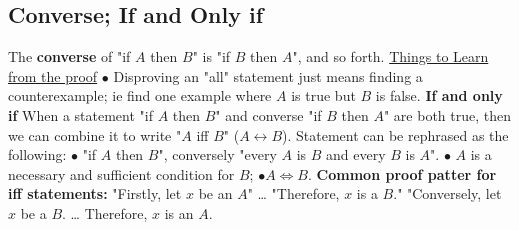 \documentclass{article}
\begin{document}
\subsection{Converse; If and Only if}
The \textbf{ converse } of "if $A$ then $B$" is "if $B$ then $A$", and so forth.
\newline
\newline
{}
\newline
\newline
{}
\newline
{}
\newline
\newline
\underline{Things to Learn from the proof}
\newline
\newline
$\bullet$ Disproving an "all" statement just means finding a counterexample;
ie find one example where $A$ is true but $B$ is false.
\newline
\newline
\textbf{If and only if} When a statement "if $A$ then $B$" and converse "if $B$ then $A$" are both true, then we can 
combine it to write "$A$ iff $B$" ($A \leftrightarrow B$).
\newline
\newline
Statement can be rephrased as the following:
\newline
$\bullet$ "if $A$ then $B$", conversely "every $A$ is $B$ and every $B$ is $A$".
\newline
$\bullet$ $A$ is a necessary and sufficient condition for $B$;
\newline
$\bullet A \Longleftrightarrow B.$ 
\newline
{}
\newline
\newline
{}
\newline
\newline
\textbf{Common proof patter for iff statements: }
\newline
"Firstly, let $x$ be an $A$"
\dots
"Therefore, $x$ is a $B$."
"Conversely, let $x$ be a $B$.
\dots
Therefore, $x$ is an $A$.
\newline
\newline
\end{document}
